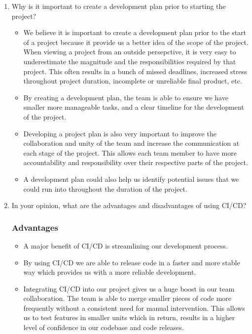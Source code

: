 \documentclass{article}
\begin{document}
\begin{enumerate}
    \item Why is it important to create a development plan prior to starting the project?

\begin{itemize}
  \item We believe it is important to create a development plan prior to the start of
  a project because it provide us a better idea of the scope of the project. When 
  viewing a project from an outside persepctive, it is very easy to underestimate
  the magnitude and the responsibilities required by that project. This often results
  in a bunch of missed deadlines, increased stress throughout project duration, 
  incomplete or unreliable final product, etc.
  \item By creating a development plan, the team is able to ensure we have smaller 
  more manageable tasks, and a clear timeline for the development of the project.
  \item Developing a project plan is also very important to improve the collaboration
  and unity of the team and increase the communication at each stage of the project.
  This allows each team member to have more accountability and responsibility over
  their respective parts of the project.
  \item A development plan could also help us identify potential issues that we could
  run into throughout the duration of the project.
\end{itemize}

    \item In your opinion, what are the advantages and disadvantages of using CI/CD?
    
\subsubsection*{Advantages}
\begin{itemize}
  \item A major benefit of CI/CD is streamlining our development process.
  \item By using CI/CD we are able to release code in a faster and more stable way which
  provides us with a more reliable development.
  \item Integrating CI/CD into our project gives us a huge boost in our team collaboration.
  The team is able to merge smaller pieces of code more frequently without a consistent
  need for manual intervention. This allows us to test features in smaller units which in
  return, results in a higher level of confidence in our codebase and code releases.
\end{itemize}


\end{enumerate}
\end{document}
